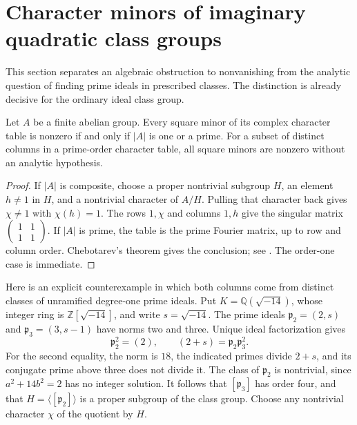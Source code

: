 \section{Character minors of imaginary quadratic class groups}
\label{sec:class-group-minors}
This section separates an algebraic obstruction to nonvanishing from
the analytic question of finding prime ideals in prescribed classes.
The distinction is already decisive for the ordinary ideal class group.

\begin{proposition}\label{prop:abelian-all-minors}
Let $A$ be a finite abelian group. Every square minor of its complex
character table is nonzero if and only if $|A|$ is one or a prime.
For a subset of distinct columns in a prime-order character table,
all square minors are nonzero without an analytic hypothesis.
\end{proposition}
\begin{proof}
If $|A|$ is composite, choose a proper nontrivial subgroup $H$, an
element $h\ne1$ in $H$, and a nontrivial character of $A/H$.
Pulling that character back gives $\chi\ne1$ with $\chi(h)=1$.
The rows $1,\chi$ and columns $1,h$ give the singular matrix
$\left(\begin{smallmatrix}1&1\\1&1\end{smallmatrix}\right)$.
If $|A|$ is prime, the table is the prime Fourier matrix, up to row
and column order. Chebotarev's theorem gives the conclusion; see
\citet[Lemma~1.3, author preprint pp.~3--4]{Tao2005}.
The order-one case is immediate.
\end{proof}

Here is an explicit counterexample in which both columns come from
distinct classes of unramified degree-one prime ideals.
Put $K=\mathbb Q(\sqrt{-14})$, whose integer ring is
$\mathbb Z[\sqrt{-14}]$, and write $s=\sqrt{-14}$.
The prime ideals $\mathfrak p_2=(2,s)$ and
$\mathfrak p_3=(3,s-1)$ have norms two and three.
Unique ideal factorization gives
\[
 \mathfrak p_2^2=(2),\qquad
 (2+s)=\mathfrak p_2\mathfrak p_3^2.
\]
For the second equality, the norm is $18$, the indicated primes
divide $2+s$, and its conjugate prime above three does not divide it.
The class of $\mathfrak p_2$ is nontrivial, since
$a^2+14b^2=2$ has no integer solution. It follows that
$[\mathfrak p_3]$ has order four, and that
$H=\langle[\mathfrak p_2]\rangle$ is a proper subgroup of the class group.
Choose any nontrivial character $\chi$ of the quotient by $H$.

